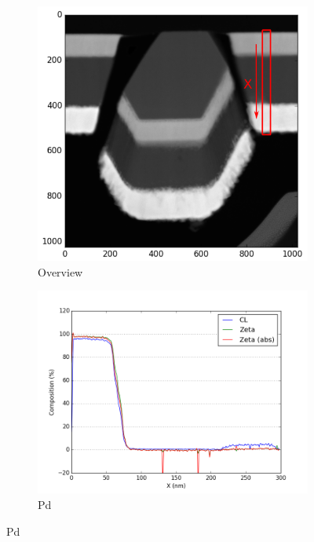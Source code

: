 \begin{figure}
	\begin{subfigure}{.5\textwidth}
		\includegraphics[width=\linewidth]{fig/q/2_overview}
		\caption{Overview}
		\label{fig:zeta_area2_overview}
	\end{subfigure}%
\hfill
	\begin{subfigure}{.5\textwidth}
		\centering
		\includegraphics[width=\linewidth]{fig/q/2_Pd2}
		\caption{Pd}
		\label{fig:zeta_area2_pd}
	\end{subfigure}

\end{figure}
